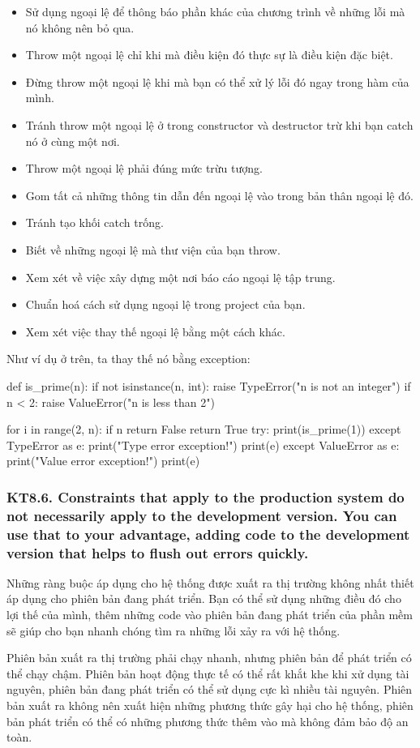 \documentclass[12pt]{report}
\begin{document}
\begin{itemize}
	\item Sử dụng ngoại lệ để thông báo phần khác của chương trình về những lỗi mà nó không nên bỏ qua.
	\item Throw một ngoại lệ chỉ khi mà điều kiện đó thực sự là điều kiện đặc biệt. 
	\item Đừng throw một ngoại lệ khi mà bạn có thể xử lý lỗi đó ngay trong hàm của mình. 
	\item Tránh throw một ngoại lệ ở trong constructor và destructor trừ khi bạn catch nó ở cùng một nơi. 
	\item Throw một ngoại lệ phải đúng mức trừu tượng. 
	\item Gom tất cả những thông tin dẫn đến ngoại lệ vào trong bản thân ngoại lệ đó. 
	\item Tránh tạo khối catch trống. 
	\item Biết về những ngoại lệ mà thư viện của bạn throw. 
	\item Xem xét về việc xây dựng một nơi báo cáo ngoại lệ tập trung. 
	\item Chuẩn hoá cách sử dụng ngoại lệ trong project của bạn. 
	\item Xem xét việc thay thế ngoại lệ bằng một cách khác. 
\end{itemize} 
Như ví dụ ở trên, ta thay thế nó bằng exception:
\begin{python}
def is_prime(n):
	if not isinstance(n, int):
		raise TypeError("n is not an integer")
	if n < 2:
		raise ValueError("n is less than 2")	
	
	for i in range(2, n):
		if n %
			return False
	return True 
try:
	print(is_prime(1))
except TypeError as e:
	print("Type error exception!")
	print(e)
except ValueError as e:
	print("Value error exception!")
	print(e)
\end{python}

\subsubsection{KT8.6. Constraints that apply to the production system do not necessarily apply to the development version. You can use that to your advantage, adding code to the development version that helps to flush out errors quickly.}
Những ràng buộc áp dụng cho hệ thống được xuất ra thị trường không nhất thiết áp dụng cho phiên bản đang phát triển. Bạn có thể sử dụng những điều đó cho lợi thế của mình, thêm những code vào phiên bản đang phát triển của phần mềm sẽ giúp cho bạn nhanh chóng tìm ra những lỗi xảy ra với hệ thống. 
\vspace*{3mm}

Phiên bản xuất ra thị trường phải chạy nhanh, nhưng phiên bản để phát triển có thể chạy chậm. Phiên bản hoạt động thực tế có thể rất khắt khe khi xử dụng tài nguyên, phiên bản đang phát triển có thể sử dụng cực kì nhiều tài nguyên. Phiên bản xuất ra không nên xuất hiện những phương thức gây hại cho hệ thống, phiên bản phát triển có thể có những phương thức thêm vào mà không đảm bảo độ an toàn. 
\end{document}
